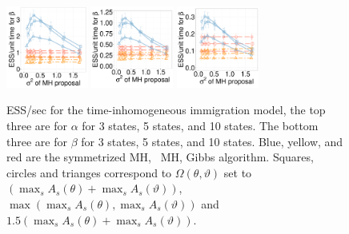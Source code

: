 \begin{figure}[H]
  \begin{minipage}[h!]{0.99\linewidth}
    \includegraphics [width=0.24\textwidth, angle=0]{figs/new_whole_exp_figs/cq_beta_dim3.pdf}
	\hspace{.6in}
    \includegraphics [width=0.24\textwidth, angle=0]{figs/new_whole_exp_figs/cq_beta_dim5.pdf}
	\hspace{.6in}
    \includegraphics [width=0.24\textwidth, angle=0]{figs/new_whole_exp_figs/cq_beta_dim10.pdf}
  \end{minipage}
    \caption{ESS/sec for the time-inhomogeneous immigration model, the top three are for $\alpha$ for 3 states, 5 states, and 10 states. The bottom three are for $\beta$ for 3 states, 5 states, and 10 states. Blue, yellow, and red are the symmetrized MH, \naive\ MH, Gibbs algorithm. Squares, circles and trianges correspond to $\Omega(\theta,\vartheta)$ set to $(\max_s A_s(\theta) + \max_s A_s(\vartheta))$, $\max(\max_s A_s(\theta), \max_s A_s(\vartheta))$ and  $1.5(\max_s A_s(\theta) + \max_s A_s(\vartheta))$.}
     \label{fig:ESS_CQ}
  \end{figure}




